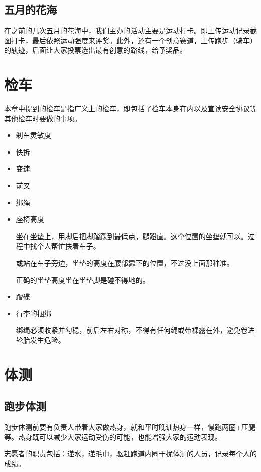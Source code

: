 \documentclass{ctexbook}
\begin{document}
\subsection{五月的花海}
在之前的几次五月的花海中，我们主办的活动主要是运动打卡。即上传运动记录截图打卡，最后依照运动强度来评奖。此外，还有一个创意赛道，上传跑步（骑车）的轨迹，后面让大家投票选出最有创意的路线，给予奖品。

\section{检车}
本章中提到的检车是指广义上的检车，即包括了检车本身在内以及宣读安全协议等其他检车时要做的事项。
\begin{itemize}

\item 刹车灵敏度

\item 快拆

\item 变速

\item 前叉

\item 绑绳

\item 座椅高度

坐在坐垫上，用脚后把脚踏踩到最低点，腿蹬直。这个位置的坐垫就可以。过程中找个人帮忙扶着车子。

或站在车子旁边，坐垫的高度在腰部靠下的位置，不过没上面那种准。

正确的坐垫高度坐在坐垫脚是碰不得地的。

\item 蹭碟

\item 行李的捆绑

绑绳必须收紧并勾稳，前后左右对称，不得有任何绳或带裸露在外，避免卷进轮胎发生危险。
\end{itemize}
\section{体测}

\subsection{跑步体测}
跑步体测前要有负责人带着大家做热身，就和平时晚训热身一样，慢跑两圈+压腿等。热身既可以减少大家运动受伤的可能，也能增强大家的运动表现。

志愿者的职责包括：递水，递毛巾，驱赶跑道内圈干扰体测的人员，记录每个人的成绩。
\end{document}
